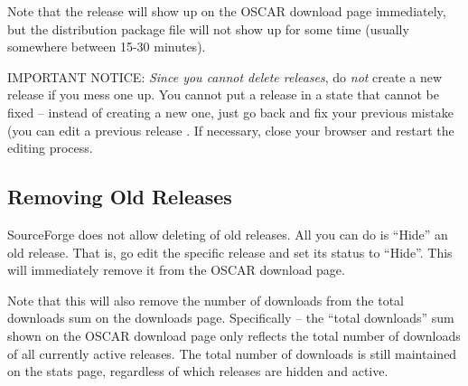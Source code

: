 Note that the release will show up on the OSCAR download page
immediately, but the distribution package file will not show up for
some time (usually somewhere between 15-30 minutes).

{\large IMPORTANT NOTICE}: {\em Since you cannot delete releases}, do
{\em not} create a new release if you mess one up.  You cannot put a
release in a state that cannot be fixed -- instead of creating a new
one, just go back and fix your previous mistake (you can edit a
previous release .  If necessary, close
your browser and restart the editing process.


\subsection{Removing Old Releases}

SourceForge does not allow deleting of old releases.  All you can do
is ``Hide'' an old release.  That is, go edit the specific release and
set its status to ``Hide''.  This will immediately remove it from the
OSCAR download page.

Note that this will also remove the number of downloads from the total
downloads sum on the downloads page.  Specifically -- the ``total
downloads'' sum shown on the OSCAR download page only reflects the
total number of downloads of all currently active releases.  The total
number of downloads is still maintained on the stats page, regardless
of which releases are hidden and active.

